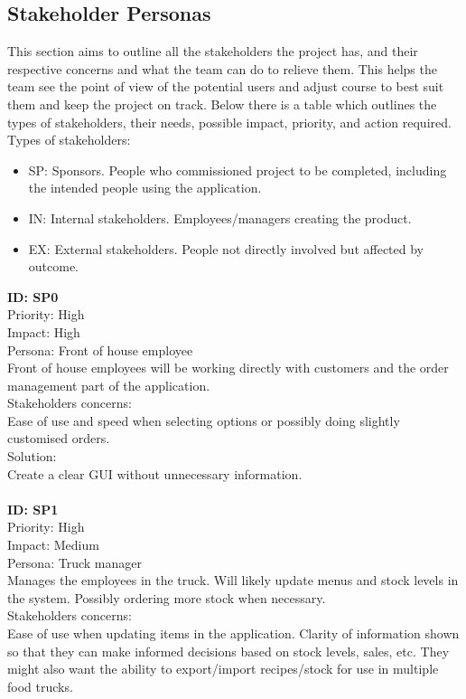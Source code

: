 
\subsection{Stakeholder Personas}
This section aims to outline all the stakeholders the project has, and their respective concerns and what the team can do to relieve them. This helps the team see the point of view of the potential users and adjust course to best suit them and keep the project on track. Below there is a table which outlines the types of stakeholders, their needs, possible impact, priority, and action required. \\
Types of stakeholders: \\
\begin{itemize}
	\item SP: Sponsors. People who commissioned project to be completed, including the intended people using the application. 
	\item IN: Internal stakeholders. Employees/managers creating the product. 
	\item EX: External stakeholders. People not directly involved but affected by outcome.\\
\end{itemize}
\textbf{ID: SP0\\}
Priority: High\\
Impact: High\\
Persona: Front of house employee\\
Front of house employees will be working directly with customers and the order management part of the application.\\
Stakeholders concerns: \\
Ease of use and speed when selecting options or possibly doing slightly customised orders.\\
Solution:\\
Create a clear GUI without unnecessary information.\\
\\
\textbf{ID: SP1\\}
Priority: High\\
Impact: Medium\\
Persona: Truck manager\\
Manages the employees in the truck. Will likely update menus and stock levels in the system. Possibly ordering more stock when necessary.\\
Stakeholders concerns:\\
Ease of use when updating items in the application. Clarity of information shown so that they can make informed decisions based on stock levels, sales, etc. They might also want the ability to export/import recipes/stock for use in multiple food trucks.\\
